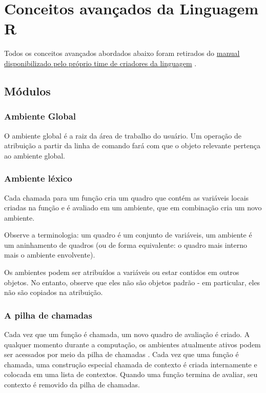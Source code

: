 \chapter{ Conceitos avançados da Linguagem R}
  \begin{comment}
    Prof. Dr. Ausberto S. Castro Vera
    UENF - CCT - LCMAT - Curso de Ciência da Computação
    Campos, RJ,  2021
    Disciplina: Paradigmas de Linguagens de Programação
    Data de entrega: 14 de out. 13:00
    C. Terceira Parte - Aspectos Avanzados
    módulos, funções, objetos, clases, subrotinas, etc.
    Segundo \cite{Sebesta2018}, a linguagem R
  \end{comment}
	Todos os conceitos avançados abordados abaixo foram retirados do \href{https://cran.r-project.org/doc/manuals/r-release/fullrefman.pdf}{manual disponibilizado pelo próprio time de criadores da linguagem} \cite{Team2021}.
  \section{Módulos}
    \subsection{Ambiente Global}
      O ambiente global é a raiz da área de trabalho do usuário. Um operação de atribuição a partir da linha de comando fará com que o objeto relevante pertença ao ambiente global. 
    \subsection{Ambiente léxico}
      Cada chamada para um função cria um quadro que contém as variáveis locais criadas na função e é avaliado em um ambiente, que em combinação cria um novo ambiente.
      
      Observe a terminologia: um quadro é um conjunto de variáveis, um ambiente é um aninhamento de quadros (ou de forma equivalente: o quadro mais interno mais o ambiente envolvente).
      
      Os ambientes podem ser atribuídos a variáveis ou estar contidos em outros objetos. No entanto, observe que eles não são objetos padrão - em particular, eles não são copiados na atribuição.
    
    \subsection{A pilha de chamadas}
      Cada vez que um função é chamada, um novo quadro de avaliação é criado. A qualquer momento durante a computação, os ambientes atualmente ativos podem ser acessados por meio da pilha de chamadas . Cada vez que uma função é chamada, uma construção especial chamada de contexto é criada internamente e colocada em uma lista de contextos. Quando uma função termina de avaliar, seu contexto é removido da pilha de chamadas.
      
